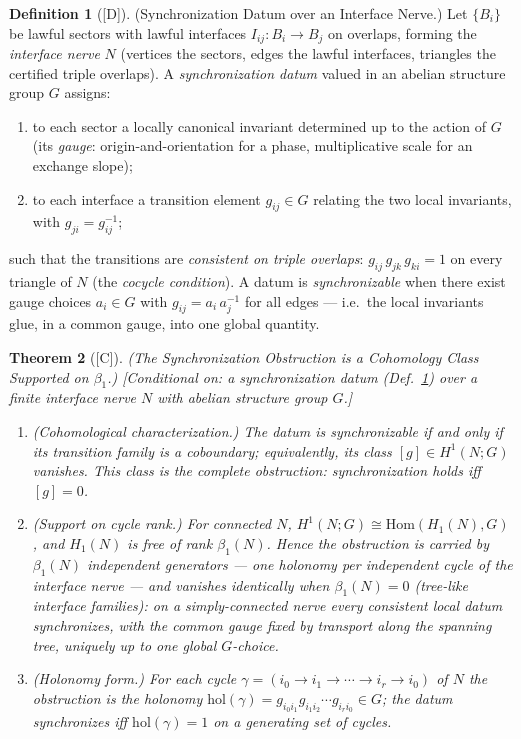 \documentclass[12pt,oneside]{amsbook}
\theoremstyle{plain}
\newtheorem{theorem}{Theorem}[section]
\theoremstyle{definition}
\newtheorem{definition}[theorem]{Definition}
\theoremstyle{remark}
\newcommand{\status}[1]{\textup{[#1]}}
\begin{document}
\begin{definition}[\status{D}]\label{def:vrp-sync-datum}
\textup{(Synchronization Datum over an Interface Nerve.)}
Let $\{B_i\}$ be lawful sectors with lawful interfaces
$I_{ij} : B_i \to B_j$ on overlaps, forming the
\emph{interface nerve} $N$ (vertices the sectors, edges the
lawful interfaces, triangles the certified triple overlaps).
A \emph{synchronization datum} valued in an abelian structure
group $G$ assigns:
\begin{enumerate}[label=\textup{(\roman*)}]
  \item to each sector a locally canonical invariant determined up
    to the action of $G$ (its \emph{gauge}: origin-and-orientation
    for a phase, multiplicative scale for an exchange slope);
  \item to each interface a transition element
    $g_{ij} \in G$ relating the two local invariants, with
    $g_{ji} = g_{ij}^{-1}$;
\end{enumerate}
such that the transitions are \emph{consistent on triple
overlaps}: $g_{ij}\, g_{jk}\, g_{ki} = 1$ on every triangle of
$N$ (the \emph{cocycle condition}).  A datum is
\emph{synchronizable} when there exist gauge choices
$a_i \in G$ with $g_{ij} = a_i\, a_j^{-1}$ for all edges --- i.e.\
the local invariants glue, in a common gauge, into one global
quantity.
\end{definition}

\begin{theorem}[\status{C}]\label{thm:vrp-sync-obstruction}
\textup{(The Synchronization Obstruction is a Cohomology Class
Supported on $\beta_1$.)}
\textup{[Conditional on: a synchronization datum
(Def.~\ref{def:vrp-sync-datum}) over a finite interface nerve $N$
with abelian structure group $G$.]}
\begin{enumerate}[label=\textup{(\arabic*)}]
  \item \emph{(Cohomological characterization.)}  The datum is
    synchronizable if and only if its transition family is a
    coboundary; equivalently, its class
    $[g] \in H^1(N; G)$ vanishes.  This class is the complete
    obstruction: synchronization holds iff $[g] = 0$.
  \item \emph{(Support on cycle rank.)}  For connected $N$,
    $H^1(N; G) \cong \mathrm{Hom}(H_1(N), G)$, and $H_1(N)$ is
    free of rank $\beta_1(N)$.  Hence the obstruction is carried
    by $\beta_1(N)$ independent generators --- one holonomy per
    independent cycle of the interface nerve --- and vanishes
    identically when $\beta_1(N) = 0$ (tree-like interface
    families): on a simply-connected nerve every consistent local
    datum synchronizes, with the common gauge fixed by transport
    along the spanning tree, uniquely up to one global $G$-choice.
  \item \emph{(Holonomy form.)}  For each cycle
    $\gamma = (i_0 \to i_1 \to \cdots \to i_r \to i_0)$ of $N$ the
    obstruction is the holonomy
    $\mathrm{hol}(\gamma) = g_{i_0 i_1} g_{i_1 i_2} \cdots
    g_{i_r i_0} \in G$; the datum synchronizes iff
    $\mathrm{hol}(\gamma) = 1$ on a generating set of cycles.
\end{enumerate}
\end{theorem}
\end{document}
